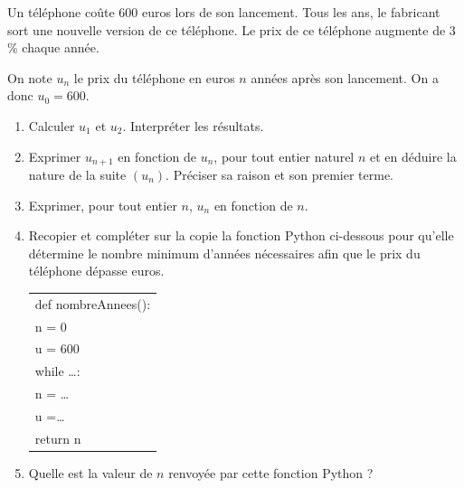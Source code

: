 \medskip

Un téléphone coûte $600$ euros lors de son lancement. Tous les ans, le fabricant sort une
nouvelle version de ce téléphone. Le prix de ce téléphone augmente de 3\,\% chaque année.

On note $u_n$ le prix du téléphone en euros $n$ années après son lancement. On a donc
$u_0 = 600$.

\medskip

\begin{enumerate}
\item Calculer $u_1$ et $u_2$. Interpréter les résultats.
\item Exprimer $u_{n+1}$ en fonction de $u_n$, pour tout entier naturel $n$ et en déduire la nature de
la suite $\left(u_n\right)$. Préciser sa raison et son premier terme.
\item Exprimer, pour tout entier $n$, $u_n$ en fonction de $n$.
\item Recopier et compléter sur la copie la fonction Python ci-dessous pour qu'elle détermine
le nombre minimum d'années nécessaires afin que le prix du téléphone dépasse 
euros.

\begin{center}
\begin{tabular}[]{|m{12.4em}|}
\hline
def nombreAnnees():\\
n = 0\\
u = 600\\
while \dots :\\
\hspace{1em}n = \dots\\
\hspace{1em}u =\dots\\
return n\\
\hline
\end{tabular}
\end{center}
\item Quelle est la valeur de $n$ renvoyée par cette fonction Python ?
\end{enumerate}
